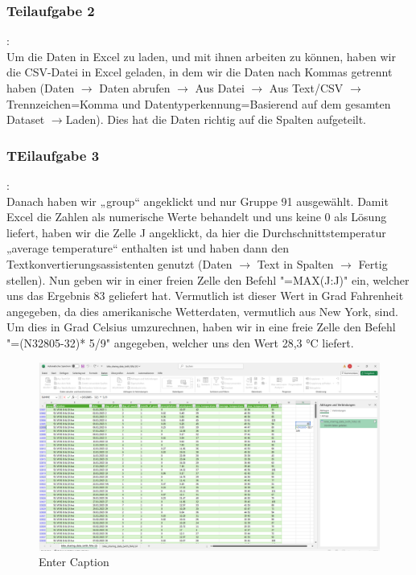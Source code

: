 \documentclass[a4paper,12pt]{article}
\begin{document}
\subsubsection{Teilaufgabe 2}: \\
Um die Daten in Excel zu laden, und mit ihnen arbeiten zu können, haben wir die CSV-Datei in Excel geladen, in dem wir die Daten nach Kommas getrennt haben (Daten $ \rightarrow $ Daten abrufen $ \rightarrow $ Aus Datei $ \rightarrow $ Aus Text/CSV $ \rightarrow $ Trennzeichen=Komma und Datentyperkennung=Basierend auf dem gesamten Dataset $ \rightarrow $Laden). Dies hat die Daten richtig auf die Spalten aufgeteilt. 
\\
\subsubsection{TEilaufgabe 3}: \\Danach haben wir „group“ angeklickt und nur Gruppe 91 ausgewählt. Damit Excel die Zahlen als numerische Werte behandelt und uns keine 0 als Lösung liefert, haben wir die Zelle J angeklickt, da hier die Durchschnittstemperatur „average temperature“ enthalten ist und haben dann den Textkonvertierungsassistenten genutzt (Daten $ \rightarrow $ Text in Spalten $ \rightarrow $ Fertig stellen).  Nun geben wir in einer freien Zelle den Befehl "=MAX(J:J)" ein, welcher uns das Ergebnis 83 geliefert hat. Vermutlich ist dieser Wert in Grad Fahrenheit angegeben, da dies amerikanische Wetterdaten, vermutlich aus New York, sind. Um dies in Grad Celsius umzurechnen, haben wir in eine freie Zelle den Befehl "=(N32805-32)* 5/9" angegeben, welcher uns den Wert 28,3 °C liefert. 
\begin{figure}[H]
    \centering
    \includegraphics[width=\textwidth]{image2.png}
    \caption{Enter Caption}
    \label{fig:enter-label}
\end{figure}
\end{document}
